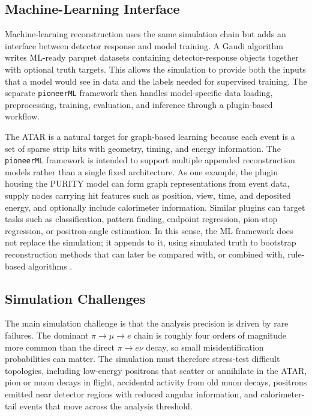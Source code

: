 \subsection{Machine-Learning Interface}
\label{subsec:simulation-ml-interface}

Machine-learning reconstruction uses the same simulation chain but adds an
interface between detector response and model training. A Gaudi algorithm
writes ML-ready parquet datasets containing detector-response objects together
with optional truth targets. This allows the simulation to provide both the
inputs that a model would see in data and the labels needed for supervised
training. The separate \texttt{pioneerML} framework then handles
model-specific data loading, preprocessing, training, evaluation, and
inference through a plugin-based workflow.

The ATAR is a natural target for graph-based learning because each event is a
set of sparse strip hits with geometry, timing, and energy information. The
\texttt{pioneerML} framework is intended to support multiple appended
reconstruction models rather than a single fixed architecture. As one example,
the plugin housing the PURITY model can form graph representations from event
data, supply nodes carrying hit features such as position, view, time, and
deposited energy, and optionally include calorimeter information. Similar
plugins can target tasks such as classification, pattern finding, endpoint
regression, pion-stop regression, or positron-angle estimation. In this sense,
the ML framework does not replace the simulation; it appends to it, using
simulated truth to bootstrap reconstruction methods that can later be compared
with, or combined with, rule-based algorithms
\cite{carlton_annual_update_2026,reconstruction_overview_2025}.

\subsection{Simulation Challenges}
\label{subsec:simulation-challenges}

The main simulation challenge is that the analysis precision is driven by rare
failures. The dominant \(\pi\to\mu\to e\) chain is roughly four orders of
magnitude more common than the direct \(\pi\to e\nu\) decay, so small
misidentification probabilities can matter. The simulation must therefore
stress-test difficult topologies, including low-energy positrons that scatter
or annihilate in the ATAR, pion or muon decays in flight, accidental activity
from old muon decays, positrons emitted near detector regions with reduced
angular information, and calorimeter-tail events that move across the analysis
threshold.

